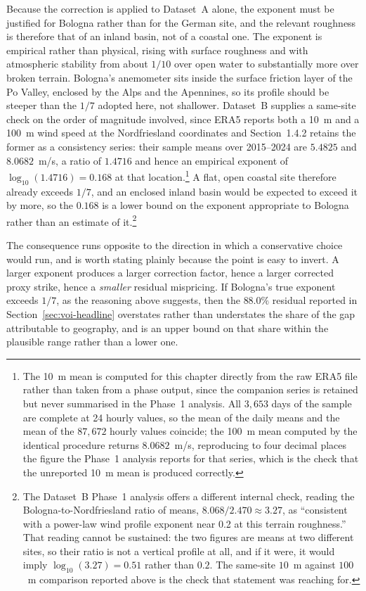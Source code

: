 \documentclass[11pt, a4paper, twoside]{article}
\begin{document}
Because the correction is applied to Dataset~A alone, the exponent must be justified for Bologna rather than for the German site, and the relevant roughness is therefore that of an inland basin, not of a coastal one. The exponent is empirical rather than physical, rising with surface roughness and with atmospheric stability from about $1/10$ over open water to substantially more over broken terrain. Bologna's anemometer sits inside the surface friction layer of the Po Valley, enclosed by the Alps and the Apennines, so its profile should be steeper than the $1/7$ adopted here, not shallower. Dataset~B supplies a same-site check on the order of magnitude involved, since ERA5 reports both a 10~m and a 100~m wind speed at the Nordfriesland coordinates and Section~1.4.2 retains the former as a consistency series: their sample means over 2015--2024 are $5.4825$ and $8.0682$~m/s, a ratio of $1.4716$ and hence an empirical exponent of $\log_{10}(1.4716) = 0.168$ at that location.\footnote{The 10~m mean is computed for this chapter directly from the raw ERA5 file rather than taken from a phase output, since the companion series is retained but never summarised in the Phase~1 analysis. All $3{,}653$ days of the sample are complete at 24 hourly values, so the mean of the daily means and the mean of the $87{,}672$ hourly values coincide; the 100~m mean computed by the identical procedure returns $8.0682$~m/s, reproducing to four decimal places the figure the Phase~1 analysis reports for that series, which is the check that the unreported 10~m mean is produced correctly.} A flat, open coastal site therefore already exceeds $1/7$, and an enclosed inland basin would be expected to exceed it by more, so the $0.168$ is a lower bound on the exponent appropriate to Bologna rather than an estimate of it.\footnote{The Dataset~B Phase~1 analysis offers a different internal check, reading the Bologna-to-Nordfriesland ratio of means, $8.068/2.470 \approx 3.27$, as ``consistent with a power-law wind profile exponent near 0.2 at this terrain roughness.'' That reading cannot be sustained: the two figures are means at two different sites, so their ratio is not a vertical profile at all, and if it were, it would imply $\log_{10}(3.27) = 0.51$ rather than $0.2$. The same-site $10$~m against $100$~m comparison reported above is the check that statement was reaching for.}

The consequence runs opposite to the direction in which a conservative choice would run, and is worth stating plainly because the point is easy to invert. A larger exponent produces a larger correction factor, hence a larger corrected proxy strike, hence a \emph{smaller} residual mispricing. If Bologna's true exponent exceeds $1/7$, as the reasoning above suggests, then the $88.0\%$ residual reported in Section~\ref{sec:voi-headline} overstates rather than understates the share of the gap attributable to geography, and is an upper bound on that share within the plausible range rather than a lower one.
\end{document}
